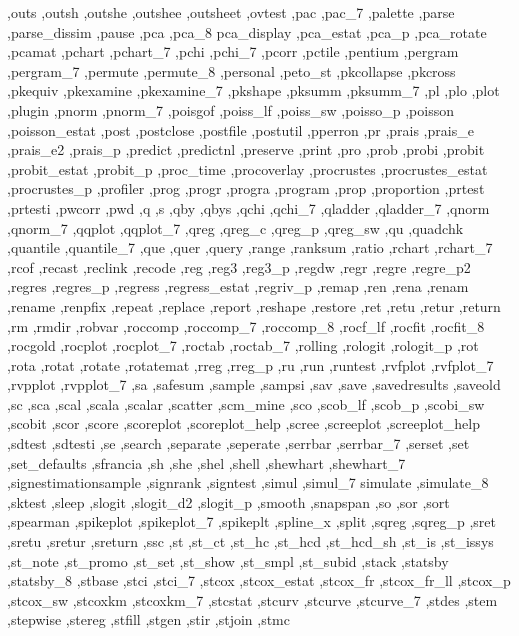 {{    ,outs ,outsh ,outshe ,outshee ,outsheet ,ovtest ,pac ,pac_7 ,palette
    ,parse ,parse_dissim ,pause ,pca ,pca_8 pca_display ,pca_estat
    ,pca_p ,pca_rotate ,pcamat ,pchart ,pchart_7 ,pchi ,pchi_7 ,pcorr
    ,pctile ,pentium ,pergram ,pergram_7 ,permute ,permute_8 ,personal
    ,peto_st ,pkcollapse ,pkcross ,pkequiv ,pkexamine ,pkexamine_7
    ,pkshape ,pksumm ,pksumm_7 ,pl ,plo ,plot ,plugin ,pnorm ,pnorm_7
    ,poisgof ,poiss_lf ,poiss_sw ,poisso_p ,poisson ,poisson_estat
    ,post ,postclose ,postfile ,postutil ,pperron ,pr ,prais ,prais_e
    ,prais_e2 ,prais_p ,predict ,predictnl ,preserve ,print ,pro ,prob
    ,probi ,probit ,probit_estat ,probit_p ,proc_time ,procoverlay
    ,procrustes ,procrustes_estat ,procrustes_p ,profiler ,prog ,progr
    ,progra ,program ,prop ,proportion ,prtest ,prtesti ,pwcorr ,pwd
    ,q ,s ,qby ,qbys ,qchi ,qchi_7 ,qladder ,qladder_7 ,qnorm ,qnorm_7
    ,qqplot ,qqplot_7 ,qreg ,qreg_c ,qreg_p ,qreg_sw ,qu ,quadchk
    ,quantile ,quantile_7 ,que ,quer ,query ,range ,ranksum ,ratio
    ,rchart ,rchart_7 ,rcof ,recast ,reclink ,recode ,reg ,reg3
    ,reg3_p ,regdw ,regr ,regre ,regre_p2 ,regres ,regres_p ,regress
    ,regress_estat ,regriv_p ,remap ,ren ,rena ,renam ,rename ,renpfix
    ,repeat ,replace ,report ,reshape ,restore ,ret ,retu ,retur ,return
    ,rm ,rmdir ,robvar ,roccomp ,roccomp_7 ,roccomp_8 ,rocf_lf ,rocfit
    ,rocfit_8 ,rocgold ,rocplot ,rocplot_7 ,roctab ,roctab_7 ,rolling
    ,rologit ,rologit_p ,rot ,rota ,rotat ,rotate ,rotatemat ,rreg
    ,rreg_p ,ru ,run ,runtest ,rvfplot ,rvfplot_7 ,rvpplot ,rvpplot_7
    ,sa ,safesum ,sample ,sampsi ,sav ,save ,savedresults ,saveold ,sc
    ,sca ,scal ,scala ,scalar ,scatter ,scm_mine ,sco ,scob_lf ,scob_p
    ,scobi_sw ,scobit ,scor ,score ,scoreplot ,scoreplot_help ,scree
    ,screeplot ,screeplot_help ,sdtest ,sdtesti ,se ,search ,separate
    ,seperate ,serrbar ,serrbar_7 ,serset ,set ,set_defaults ,sfrancia
    ,sh ,she ,shel ,shell ,shewhart ,shewhart_7 ,signestimationsample
    ,signrank ,signtest ,simul ,simul_7 simulate ,simulate_8 ,sktest
    ,sleep ,slogit ,slogit_d2 ,slogit_p ,smooth ,snapspan ,so ,sor
    ,sort ,spearman ,spikeplot ,spikeplot_7 ,spikeplt ,spline_x ,split
    ,sqreg ,sqreg_p ,sret ,sretu ,sretur ,sreturn ,ssc ,st ,st_ct ,st_hc
    ,st_hcd ,st_hcd_sh ,st_is ,st_issys ,st_note ,st_promo ,st_set
    ,st_show ,st_smpl ,st_subid ,stack ,statsby ,statsby_8 ,stbase
    ,stci ,stci_7 ,stcox ,stcox_estat ,stcox_fr ,stcox_fr_ll ,stcox_p
    ,stcox_sw ,stcoxkm ,stcoxkm_7 ,stcstat ,stcurv ,stcurve ,stcurve_7
    ,stdes ,stem ,stepwise ,stereg ,stfill ,stgen ,stir ,stjoin ,stmc
}}

